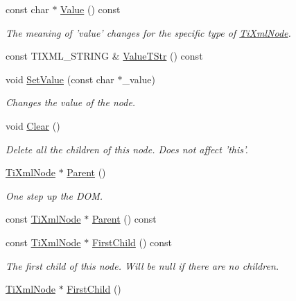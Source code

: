\begin{DoxyCompactItemize}
const char $\ast$ \hyperlink{classTiXmlNode_a77943eb90d12c2892b1337a9f5918b41}{Value} () const 
\begin{DoxyCompactList}\small\item\em The meaning of 'value' changes for the specific type of \hyperlink{classTiXmlNode}{TiXmlNode}. \item\end{DoxyCompactList}\item 
const TIXML\_\-STRING \& \hyperlink{classTiXmlNode_a83ece13d2ea66dac66e0b21332229239}{ValueTStr} () const 
\item 
void \hyperlink{classTiXmlNode_a2a38329ca5d3f28f98ce932b8299ae90}{SetValue} (const char $\ast$\_\-value)
\begin{DoxyCompactList}\small\item\em Changes the value of the node. \item\end{DoxyCompactList}\item 
void \hyperlink{classTiXmlNode_a708e7f953df61d4d2d12f73171550a4b}{Clear} ()
\begin{DoxyCompactList}\small\item\em Delete all the children of this node. Does not affect 'this'. \item\end{DoxyCompactList}\item 
\hyperlink{classTiXmlNode}{TiXmlNode} $\ast$ \hyperlink{classTiXmlNode_ab643043132ffd794f8602685d34a982e}{Parent} ()
\begin{DoxyCompactList}\small\item\em One step up the DOM. \item\end{DoxyCompactList}\item 
const \hyperlink{classTiXmlNode}{TiXmlNode} $\ast$ \hyperlink{classTiXmlNode_a78878709e53066f06eb4fcbcdd3a5260}{Parent} () const 
\item 
const \hyperlink{classTiXmlNode}{TiXmlNode} $\ast$ \hyperlink{classTiXmlNode_a44c8eee26bbe2d1b2762038df9dde2f0}{FirstChild} () const 
\begin{DoxyCompactList}\small\item\em The first child of this node. Will be null if there are no children. \item\end{DoxyCompactList}\item 
\hyperlink{classTiXmlNode}{TiXmlNode} $\ast$ \hyperlink{classTiXmlNode_a5e97d69b7c0ebd27fb7286be56559b77}{FirstChild} ()

\end{DoxyCompactItemize}
